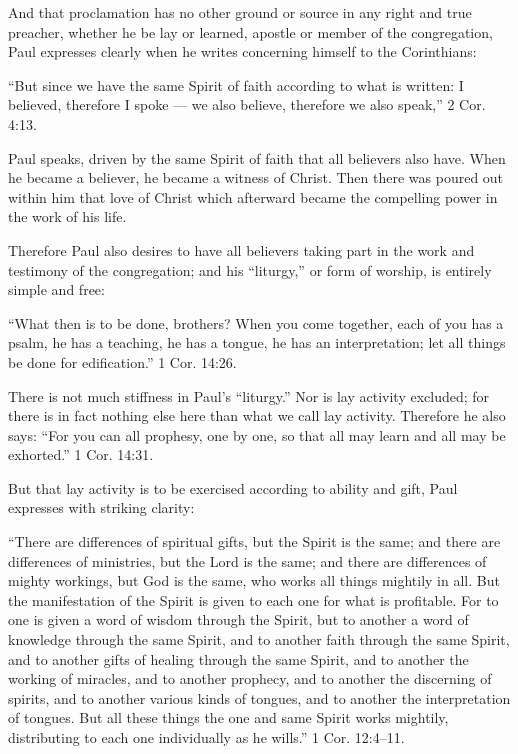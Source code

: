 And that proclamation has no other ground or source in any right and true preacher, whether he be lay or learned, apostle or member of the congregation, Paul expresses clearly when he writes concerning himself to the Corinthians:

“But since we have the same Spirit of faith according to what is written: I believed, therefore I spoke — we also believe, therefore we also speak,” 2 Cor. 4:13.

Paul speaks, driven by the same Spirit of faith that all believers also have. When he became a believer, he became a witness of Christ. Then there was poured out within him that love of Christ which afterward became the compelling power in the work of his life.

Therefore Paul also desires to have all believers taking part in the work and testimony of the congregation; and his “liturgy,” or form of worship, is entirely simple and free:

“What then is to be done, brothers? When you come together, each of you has a psalm, he has a teaching, he has a tongue, he has an interpretation; let all things be done for edification.” 1 Cor. 14:26.

There is not much stiffness in Paul’s “liturgy.” Nor is lay activity excluded; for there is in fact nothing else here than what we call lay activity. Therefore he also says: “For you can all prophesy, one by one, so that all may learn and all may be exhorted.” 1 Cor. 14:31.

But that lay activity is to be exercised according to ability and gift, Paul expresses with striking clarity:

“There are differences of spiritual gifts, but the Spirit is the same; and there are differences of ministries, but the Lord is the same; and there are differences of mighty workings, but God is the same, who works all things mightily in all. But the manifestation of the Spirit is given to each one for what is profitable. For to one is given a word of wisdom through the Spirit, but to another a word of knowledge through the same Spirit, and to another faith through the same Spirit, and to another gifts of healing through the same Spirit, and to another the working of miracles, and to another prophecy, and to another the discerning of spirits, and to another various kinds of tongues, and to another the interpretation of tongues. But all these things the one and same Spirit works mightily, distributing to each one individually as he wills.” 1 Cor. 12:4–11.


